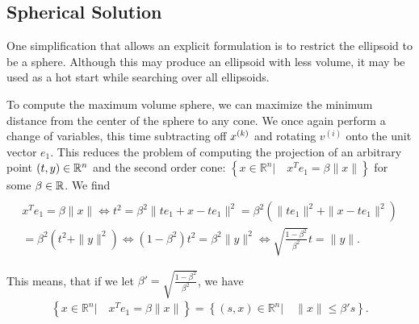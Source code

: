 %             
% 


\subsection{Spherical Solution}

One simplification that allows an explicit formulation is to restrict the ellipsoid to be a sphere.
Although this may produce an ellipsoid with less volume, it may be used as a hot start while searching over all ellipsoids.

To compute the maximum volume sphere, we can maximize the minimum distance from the center of the sphere to any cone.
We once again perform a change of variables, this time subtracting off $x^{(k)}$ and rotating $v^{(i)}$ onto the unit vector $e_1$.
This reduces the problem of computing the projection of an arbitrary point $(t, y) \in \mathbb R^n$ and the second order cone: $\left\{ x \in \mathbb R^n | \quad x^Te_1 = \beta \|x\| \right\}$ for some $\beta \in \mathbb R$.  
We find
\begin{align*}
 \\
x^Te_1 = \beta \|x\| 
 \Longleftrightarrow t^2 = \beta^2 \|te_1  + x - t e_1\|^2 
  = \beta^2 \left(\|te_1\|^2  + \|x - t e_1\|^2\right) \\
= \beta^2 \left(t^2  + \|y\|^2 \right) 
 \Longleftrightarrow (1 - \beta^2)t^2 = \beta^2 \|y\|^2 
 \Longleftrightarrow \sqrt{\frac{1 - \beta^2}{ \beta^2}} t = \|y\|.
\end{align*}


This means, that if we let $\beta' = \sqrt{\frac{1 - \beta^2}{\beta^2}}$, we have
\begin{align*}
\left\{ x \in \mathbb R^n | \quad x^Te_1 = \beta \|x\| \right\} = \left \{(s, x)\in \mathbb R^n | \quad\|x\| \le \beta' s \right\}.
\end{align*}

